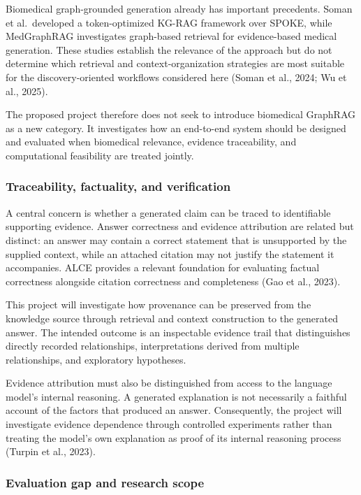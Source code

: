 Biomedical graph-grounded generation already has important precedents. Soman et al.~developed a token-optimized KG-RAG framework over SPOKE, while MedGraphRAG investigates graph-based retrieval for evidence-based medical generation. These studies establish the relevance of the approach but do not determine which retrieval and context-organization strategies are most suitable for the discovery-oriented workflows considered here (Soman et al., 2024; Wu et al., 2025).

The proposed project therefore does not seek to introduce biomedical GraphRAG as a new category. It investigates how an end-to-end system should be designed and evaluated when biomedical relevance, evidence traceability, and computational feasibility are treated jointly.

\subsubsection{Traceability, factuality, and verification}\label{traceability-factuality-and-verification}

A central concern is whether a generated claim can be traced to identifiable supporting evidence. Answer correctness and evidence attribution are related but distinct: an answer may contain a correct statement that is unsupported by the supplied context, while an attached citation may not justify the statement it accompanies. ALCE provides a relevant foundation for evaluating factual correctness alongside citation correctness and completeness (Gao et al., 2023).

This project will investigate how provenance can be preserved from the knowledge source through retrieval and context construction to the generated answer. The intended outcome is an inspectable evidence trail that distinguishes directly recorded relationships, interpretations derived from multiple relationships, and exploratory hypotheses.

Evidence attribution must also be distinguished from access to the language model's internal reasoning. A generated explanation is not necessarily a faithful account of the factors that produced an answer. Consequently, the project will investigate evidence dependence through controlled experiments rather than treating the model's own explanation as proof of its internal reasoning process (Turpin et al., 2023).

\subsubsection{Evaluation gap and research scope}\label{evaluation-gap-and-research-scope}

